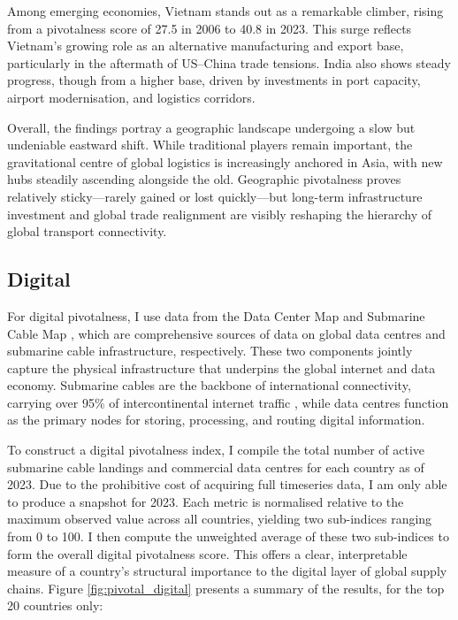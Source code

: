 \documentclass[11pt]{article}
\begin{document}
Among emerging economies, Vietnam stands out as a remarkable climber, rising from a pivotalness score of 27.5 in 2006 to 40.8 in 2023. This surge reflects Vietnam’s growing role as an alternative manufacturing and export base, particularly in the aftermath of US–China trade tensions. India also shows steady progress, though from a higher base, driven by investments in port capacity, airport modernisation, and logistics corridors.

Overall, the findings portray a geographic landscape undergoing a slow but undeniable eastward shift. While traditional players remain important, the gravitational centre of global logistics is increasingly anchored in Asia, with new hubs steadily ascending alongside the old. Geographic pivotalness proves relatively sticky—rarely gained or lost quickly—but long-term infrastructure investment and global trade realignment are visibly reshaping the hierarchy of global transport connectivity.


\subsection{Digital}

For digital pivotalness, I use data from the Data Center Map \citep{datacentermap2023} and Submarine Cable Map \citep{submarinecablemap2023}, which are comprehensive sources of data on global data centres and submarine cable infrastructure, respectively. These two components jointly capture the physical infrastructure that underpins the global internet and data economy. Submarine cables are the backbone of international connectivity, carrying over 95\% of intercontinental internet traffic \citep{noaa2024}, while data centres function as the primary nodes for storing, processing, and routing digital information.

To construct a digital pivotalness index, I compile the total number of active submarine cable landings and commercial data centres for each country as of 2023. Due to the prohibitive cost of acquiring full timeseries data, I am only able to produce a snapshot for 2023. Each metric is normalised relative to the maximum observed value across all countries, yielding two sub-indices ranging from 0 to 100. I then compute the unweighted average of these two sub-indices to form the overall digital pivotalness score. This offers a clear, interpretable measure of a country’s structural importance to the digital layer of global supply chains. Figure \ref{fig:pivotal_digital} presents a summary of the results, for the top 20 countries only:
\end{document}

